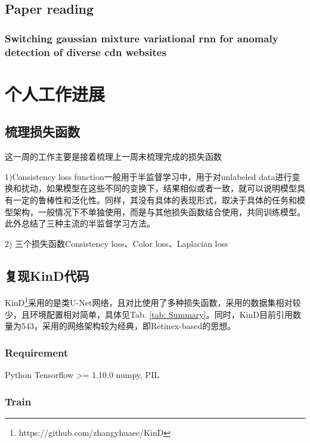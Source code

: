 \documentclass[letterpaper,12pt]{article}
\begin{document}
	\subsection{Paper reading}
	
	\subsubsection{Switching gaussian mixture variational rnn for anomaly detection of diverse cdn websites}
	
	
	
	\section{个人工作进展}
	
	\subsection{梳理损失函数}
	
	这一周的工作主要是接着梳理上一周未梳理完成的损失函数
	
	1)Consistency loss function一般用于半监督学习中，用于对unlabeled data进行变换和扰动，如果模型在这些不同的变换下，结果相似或者一致，就可以说明模型具有一定的鲁棒性和泛化性。同样，其没有具体的表现形式，取决于具体的任务和模型架构，一般情况下不单独使用，而是与其他损失函数结合使用，共同训练模型。此外总结了三种主流的半监督学习方法。
	
	2)
	三个损失函数Consistency loss、Color loss、Laplacian loss
	
	
	\subsection{复现KinD代码}
	
	KinD\footnote{https://github.com/zhangyhuaee/KinD}采用的是类U-Net网络，且对比使用了多种损失函数，采用的数据集相对较少，且环境配置相对简单，具体见Tab. \ref{tab: Summary}。同时，KinD\cite{10.1145/3343031.3350926}目前引用数量为543，采用的网络架构较为经典，即Retinex-based的思想。
	
		\subsubsection{Requirement}
	
		\begin{python}
		Python
		Tensorflow >= 1.10.0
		numpy, PIL
		\end{python}
	
		\subsubsection{Train}
	
\end{document}
